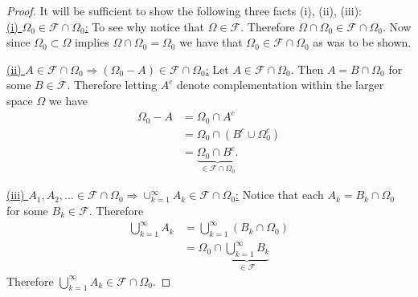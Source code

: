 \documentclass[10pt,letterpaper,twocolumn]{article}
\begin{document}
\begin{proof} It will be sufficient to show the following three facts (i), (ii), (iii):\\
\underline{(i) $\Omega_0\in \mathcal F\cap \Omega_0$:}
To see why notice that $\Omega \in \mathcal F$. Therefore $\Omega\cap \Omega_0\in \mathcal F\cap \Omega_0$. Now since $\Omega_0\subset \Omega$ implies $\Omega\cap\Omega_0= \Omega_0$ we have that $\Omega_0\in \mathcal F\cap \Omega_0$ as was to be shown.

\noindent
\underline{(ii) $A\in \mathcal F\cap \Omega_0\Rightarrow (\Omega_0 - A)\in \mathcal F\cap \Omega_0$:} Let $A\in \mathcal F\cap \Omega_0$. Then $A = B\cap \Omega_0$ for some $B\in\mathcal F$. Therefore letting $A^c$ denote complementation within the larger space $\Omega$ we have
\begin{align*}
\Omega_0-A & = \Omega_0 \cap A^c\\
& =\Omega_0 \cap (B^c \cup \Omega_0^c)\\
& =\underbrace{\Omega_0 \cap B^c.}_{\in\mathcal F\cap \Omega_0}
\end{align*}

\noindent
\underline{(iii) $A_1,A_2,\ldots \in \mathcal F\cap \Omega_0\Rightarrow \cup_{k=1}^\infty A_k\in \mathcal F\cap \Omega_0$:} Notice that each $A_k = B_k\cap \Omega_0$ for some $B_k\in\mathcal F$. Therefore
\begin{align*}
\bigcup_{k=1}^\infty A_k &=\bigcup_{k=1}^\infty (B_k\cap \Omega_0)\\
&=\Omega_0\cap \underbrace{\bigcup_{k=1}^\infty B_k}_{\in \mathcal F}
\end{align*}
Therefore $\bigcup_{k=1}^\infty A_k \in \mathcal F\cap \Omega_0$.
\end{proof}
\end{document}
